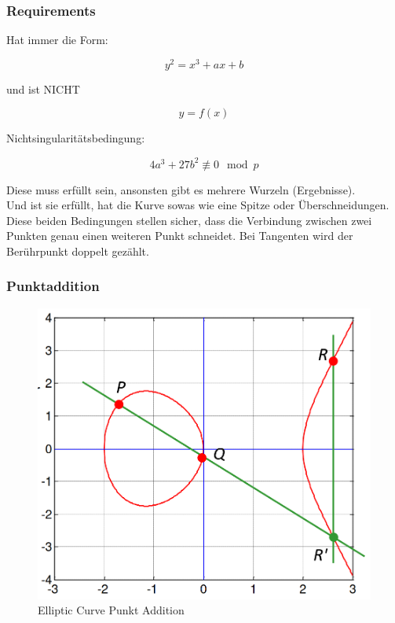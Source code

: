 \documentclass[12pt]{scrartcl}
\begin{document}
\newpage
\subsubsection{Requirements}

Hat immer die Form:

\[ y^2 = x^3 + ax + b \]

und ist NICHT

\[ y = f(x) \]


Nichtsingularitätsbedingung:

\[ 4a^3 + 27b^2 \not\equiv 0 \mod p \]

Diese muss erfüllt sein, ansonsten gibt es mehrere Wurzeln (Ergebnisse).\\
Und ist sie erfüllt, hat die Kurve sowas wie eine Spitze oder Überschneidungen.\\


Diese beiden Bedingungen stellen sicher, dass die Verbindung zwischen zwei Punkten genau
einen weiteren Punkt schneidet. Bei Tangenten wird der Berührpunkt doppelt gezählt.





\newpage
\subsubsection{Punktaddition}

\begin{figure}[ht]
    \centering
    \includegraphics[width=\textwidth]{img/elliptic_curve_addition.png}
    \caption{Elliptic Curve Punkt Addition}
    \label{fig:elliptic_curve_addition}
\end{figure}
\end{document}
